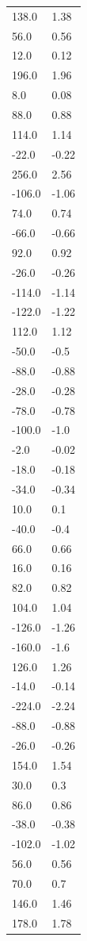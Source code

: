 \begin{longtable}{ll}
138.0 & 1.38 \\
56.0 & 0.56 \\
12.0 & 0.12 \\
196.0 & 1.96 \\
8.0 & 0.08 \\
88.0 & 0.88 \\
114.0 & 1.14 \\
-22.0 & -0.22 \\
256.0 & 2.56 \\
-106.0 & -1.06 \\
74.0 & 0.74 \\
-66.0 & -0.66 \\
92.0 & 0.92 \\
-26.0 & -0.26 \\
-114.0 & -1.14 \\
-122.0 & -1.22 \\
112.0 & 1.12 \\
-50.0 & -0.5 \\
-88.0 & -0.88 \\
-28.0 & -0.28 \\
-78.0 & -0.78 \\
-100.0 & -1.0 \\
-2.0 & -0.02 \\
-18.0 & -0.18 \\
-34.0 & -0.34 \\
10.0 & 0.1 \\
-40.0 & -0.4 \\
66.0 & 0.66 \\
16.0 & 0.16 \\
82.0 & 0.82 \\
104.0 & 1.04 \\
-126.0 & -1.26 \\
-160.0 & -1.6 \\
126.0 & 1.26 \\
-14.0 & -0.14 \\
-224.0 & -2.24 \\
-88.0 & -0.88 \\
-26.0 & -0.26 \\
154.0 & 1.54 \\
30.0 & 0.3 \\
86.0 & 0.86 \\
-38.0 & -0.38 \\
-102.0 & -1.02 \\
56.0 & 0.56 \\
70.0 & 0.7 \\
146.0 & 1.46 \\
178.0 & 1.78 \\

\end{longtable}
